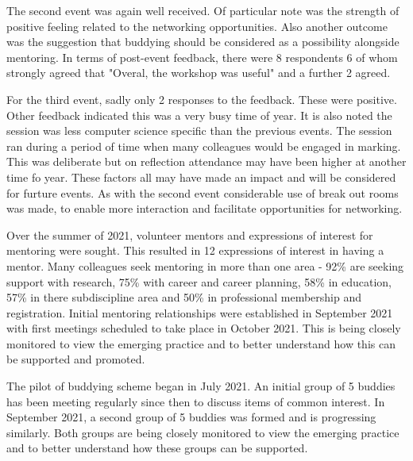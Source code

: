 \documentclass[sigconf]{acmart}
\begin{document}
The second event was again well received. Of particular note was the strength of positive feeling related to the networking opportunities. Also another outcome was the suggestion that buddying should be considered as a possibility alongside mentoring. In terms of post-event feedback, there were 8 respondents 6 of whom strongly agreed that "Overal, the workshop was useful" and a further 2 agreed.

For the third event, sadly only 2 responses to the feedback. These were positive. Other feedback indicated this was a very busy time of year. It is also noted the session was less computer science specific than the previous events. The session ran during a period of time when many colleagues would be engaged in marking. This was deliberate but on reflection attendance may have been higher at another time fo year. These factors all may have made an impact and will be considered for furture events. As with the second event considerable use of break out rooms was made, to enable more interaction and facilitate opportunities for networking.

\begin{comment}
TO DO - evaluation of Mentoring - PH what is needed here? Is sufficient to indicate the first pilot of 10 Mentees has been established? Or do we need feedback from the participants?
\end{comment}

Over the summer of 2021, volunteer mentors and expressions of interest for mentoring were sought. This resulted in 12 expressions of interest in having a mentor. Many colleagues seek mentoring in more than one area - 92\% are seeking support with research, 75\% with career and career planning, 58\% in education, 57\% in there subdiscipline area and 50\% in professional membership and registration. Initial mentoring relationships were established in September 2021 with first meetings scheduled to take place in October 2021. This is being closely monitored to view the emerging practice and to better understand how this can be supported and promoted.

\begin{comment}
To DO - evaluation of Buddying - PH what is needed here? Is sufficient to indicate the first pilot of 10 buddies has been established? Or do we need feedback from the participants?
\end{comment}

The pilot of buddying scheme began in July 2021. An initial group of 5 buddies has been meeting regularly since then to discuss items of common interest. In September 2021, a second group of 5 buddies was formed and is progressing similarly. Both groups are being closely monitored to view the emerging practice and to better understand how these groups can be supported.
\end{document}
